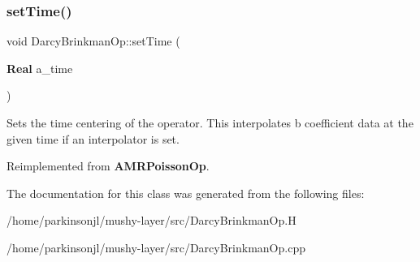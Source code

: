 \subsubsection{\texorpdfstring{set\+Time()}{setTime()}}
{\footnotesize\ttfamily void Darcy\+Brinkman\+Op\+::set\+Time (\begin{DoxyParamCaption}\item[{\textbf{ Real}}]{a\+\_\+time }\end{DoxyParamCaption})\hspace{0.3cm}{\ttfamily [virtual]}}

Sets the time centering of the operator. This interpolates b coefficient data at the given time if an interpolator is set. 

Reimplemented from \textbf{ A\+M\+R\+Poisson\+Op}.



The documentation for this class was generated from the following files\+:\begin{DoxyCompactItemize}
\item 
/home/parkinsonjl/mushy-\/layer/src/Darcy\+Brinkman\+Op.\+H\item 
/home/parkinsonjl/mushy-\/layer/src/Darcy\+Brinkman\+Op.\+cpp\end{DoxyCompactItemize}

